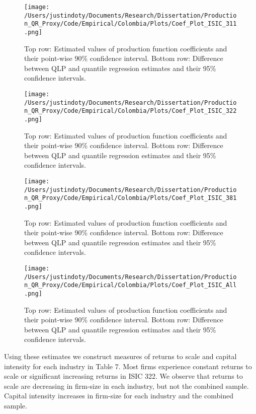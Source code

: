 \documentclass[11pt]{article}
\begin{document}
\begin{figure}[H]
\centering
\texttt{[image: /Users/justindoty/Documents/Research/Dissertation/Production\_QR\_Proxy/Code/Empirical/Colombia/Plots/Coef\_Plot\_ISIC\_311.png]}
\caption{Top row: Estimated values of production function coefficients and their point-wise 90\% confidence interval. Bottom row: Difference between QLP and quantile regression estimates and their 95\% confidence intervals.}
\label{fig:COL311}
\end{figure}

\begin{figure}[H]
\centering
\texttt{[image: /Users/justindoty/Documents/Research/Dissertation/Production\_QR\_Proxy/Code/Empirical/Colombia/Plots/Coef\_Plot\_ISIC\_322.png]}
\caption{Top row: Estimated values of production function coefficients and their point-wise 90\% confidence interval. Bottom row: Difference between QLP and quantile regression estimates and their 95\% confidence intervals.}
\label{fig:COL321}
\end{figure}

\begin{figure}[H]
\centering
\texttt{[image: /Users/justindoty/Documents/Research/Dissertation/Production\_QR\_Proxy/Code/Empirical/Colombia/Plots/Coef\_Plot\_ISIC\_381.png]}
\caption{Top row: Estimated values of production function coefficients and their point-wise 90\% confidence interval. Bottom row: Difference between QLP and quantile regression estimates and their 95\% confidence intervals.}
\label{fig:COL381}
\end{figure}

\begin{figure}[H]
\centering
\texttt{[image: /Users/justindoty/Documents/Research/Dissertation/Production\_QR\_Proxy/Code/Empirical/Colombia/Plots/Coef\_Plot\_ISIC\_All.png]}
\caption{Top row: Estimated values of production function coefficients and their point-wise 90\% confidence interval. Bottom row: Difference between QLP and quantile regression estimates and their 95\% confidence intervals.}
\label{fig:COLall}
\end{figure}

Using these estimates we construct measures of returns to scale and capital intensity for each industry in Table 7. Most firms experience constant returns to scale or significant increasing returns in ISIC 322. We observe that returns to scale are decreasing in firm-size in each industry, but not the combined sample. Capital intensity increases in firm-size for each industry and the combined sample.
\end{document}
